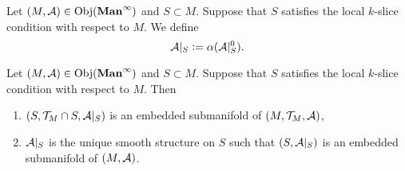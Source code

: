 \documentclass{book}
\begin{document}
	\begin{defn}
			Let $(M, \mathcal{A}) \in \operatorname{Obj}(\operatorname*{\text{\textbf{Man}}^{\infty}})$ and $S \subset M$. Suppose that $S$ satisfies the local $k$-slice condition with respect to $M$. We define 
			$$\mathcal{A}|_S \vcentcolon= \alpha(\mathcal{A}|_S^0).$$
	\end{defn}
	
	\begin{ex}
		Let $(M, \mathcal{A}) \in \operatorname{Obj}(\operatorname*{\text{\textbf{Man}}^{\infty}})$ and $S \subset M$. Suppose that $S$ satisfies the local $k$-slice condition with respect to $M$. Then 
		\begin{enumerate}
			\item $(S, \mathcal{T}_M \cap S, \mathcal{A}|_S)$ is an embedded submanifold of $(M, \mathcal{T}_M, \mathcal{A})$,
			\item $\mathcal{A}|_S$ is the unique smooth structure on $S$ such that $(S, \mathcal{A}|_S)$ is an embedded submanifold of $(M, \mathcal{A})$. 
		\end{enumerate}		
	\end{ex}
\end{document}
